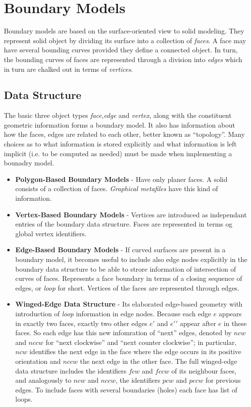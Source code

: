 \documentclass[12pt,a4paper,openbib]{article}
\begin{document}
\section{Boundary Models}
Boundary models are based on the surface-oriented view to solid modeling. They
represent solid object by dividing its surface into a collection of {\em faces}.
A face may have several bounding curves provided they define a connected object.
In turn, the bounding curves of faces are represented through a division into
{\em edges} which in turn are chalked out in terms of {\em vertices}.
\subsection{Data Structure}
The basic three object types {\em face,edge} and {\em vertex}, along with the
constituent geometric information forms a boundary model. It also has 
information about how the faces, edges are related to each other, better known
as ``topology''. Many choices as to what information is stored explicitly and
what information is left implicit (i.e. to be computed as needed) must be made
when implementing a bounadry model.
\begin{itemize}
	\item {\bf Polygon-Based Boundary Models} - Have only planer faces. A solid
		consists of a collection of faces. {\em Graphical metafiles} have this
		kind of information.
	\item {\bf Vertex-Based Boundary Models} - Vertices are introduced as
		independant entries of the boundary data structure. Faces are 
		represented in terms og global vertex identifiers.
	\item {\bf Edge-Based Boundary Models} - If curved surfaces are present in
		a boundary model, it becomes useful to include also edge nodes 
		explicitly in the boundary data structure to be able to strore 
		information of intersection of curves of faces. Represents a face 
		boundary in terms of a closing sequence of edges, or {\em loop} for 
		short. Vertices of the faces are represented through edges.
	\item {\bf Winged-Edge Data Structure} - Its elaborated edge-based 
		geometry with introduction of {\em loop} information in edge nodes.
		Because each edge $e$ appears in exactly two faces, exactly two other
		edges $e\prime$ and $e\prime \prime$ appear after $e$ in these faces.
		So each edge has this new infomration of ``next'' edges, denoted by
		$ncw$ and $nccw$ for ``next clockwise'' and ``next counter clockwise'';
		in particular, $ncw$ identifies the next edge in the face where the 
		edge occurs in its positive orientation and $nccw$ the next edge in
		the other face. The full winged-edge data structure includes the
		identifiers $fcw$ and $fccw$ of its neighbour faces, and analogously
		to $ncw$ and $nccw$, the identifiers $pcw$ and $pccw$ for previous
		edges. To include faces with several boundaries (holes) each face has
		list of loops.
\end{itemize}
\end{document}
